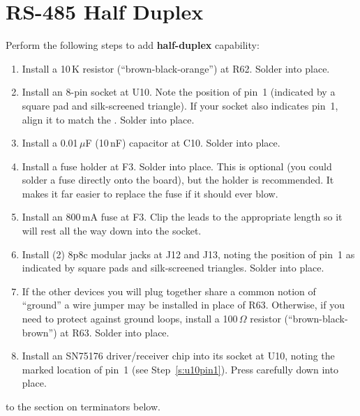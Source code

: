 \documentclass[letterpaper,twoside,onecolumn,openright,final]{memoir}
\begin{document}
\section{RS-485 Half Duplex}
Perform the following steps to add {\bfseries half-duplex}  capability:
\begin{enumerate}
\item	Install a 10\,K resistor (``brown-black-orange'') at R62.  Solder into place.
\item\label{s:u10pin1}
	Install an 8-pin  socket at U10.  Note the position of pin~1 (indicated
	by a square pad and silk-screened triangle).  If your socket also indicates pin~1, align
	it to match the . Solder into place.
\item	Install a 0.01\,$\mu$F (10\,nF) capacitor at C10. Solder into place.
\item	Install a fuse holder at F3.  Solder into place.  This is optional (you could solder a fuse
	directly onto the board), but the holder is recommended.  It makes it far easier to replace
	the fuse if it should ever blow.
\item	Install an 800\,mA fuse at F3.  Clip the leads to the appropriate length so it will rest
	all the way down into the socket.
\item	Install (2) 8p8c modular jacks at J12 and J13, noting the position of pin~1 as indicated by
	square pads and silk-screened triangles.  Solder into place.
\item	If the other devices you will plug together share a common notion of ``ground'' a wire jumper
	may be installed in place of R63.  Otherwise, if you need to protect against ground loops,
	install a 100\,$\Omega$ resistor (``brown-black-brown'') at R63. Solder into place.
\item	Install an SN75176 driver/receiver chip into its socket at U10, noting the marked location
	of pin~1 (see Step~\ref{s:u10pin1}).  Press carefully down into place.
\end{enumerate}

\bigskip{} to the section on  terminators below.
\end{document}
